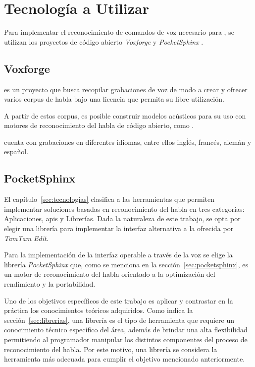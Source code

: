 \section{Tecnolog\'ia a Utilizar}
\label{sec:tecnologia-utilizada}
Para implementar el reconocimiento  de comandos de voz necesario para , 
se utilizan los proyectos de c\'odigo abierto \emph{Voxforge} \cite{Voxforge} y 
\emph{PocketSphinx} \cite{PocketSphinxHomePage}. 

\subsection{Voxforge}
\label{sec:voxforge-solucion}

 es un proyecto que busca recopilar grabaciones de voz de modo a crear 
y ofrecer varios corpus de habla bajo una licencia que permita su libre utilizaci\'on. 

A partir de estos corpus, es posible construir modelos ac\'usticos para su uso con motores de 
reconocimiento del habla de c\'odigo abierto, como .

 cuenta con grabaciones en diferentes idiomas, entre ellos ingĺ\'es, franc\'es, 
alem\'an y espa\~nol.


\subsection{PocketSphinx}
\label{sec:pocketsphinx-solucion}

El cap\'itulo~\ref{sec:tecnologias} clasifica a las herramientas que permiten implementar soluciones
basadas en reconocimiento del habla en tres categor\'ias: Aplicaciones, \gls{api}s y Librer\'ias. 
Dada la naturaleza de este trabajo, se opta por elegir una librer\'ia para implementar la interfaz
alternativa a la ofrecida por \emph{TamTam Edit}.

Para la implementaci\'on de la interfaz operable a trav\'es de la voz se elige la librer\'ia 
\emph{PocketSphinx} que, como se menciona en la secci\'on~\ref{sec:pocketsphinx}, es un motor de 
reconocimiento del habla orientado a la optimizaci\'on del rendimiento y la portabilidad.

Uno de los objetivos espec\'ificos de este trabajo es aplicar y contrastar en la pr\'actica
los conocimientos te\'oricos adquiridos. Como indica la secci\'on~\ref{sec:librerias}, una librer\'ia es
el tipo de herramienta que requiere un conocimiento t\'ecnico espec\'ifico del \'area, adem\'as de
brindar una alta flexibilidad permitiendo al programador manipular los distintos componentes del
proceso de reconocimiento del habla. Por este motivo, una librer\'ia se considera la herramienta 
m\'as adecuada para cumplir el objetivo mencionado anteriormente.

